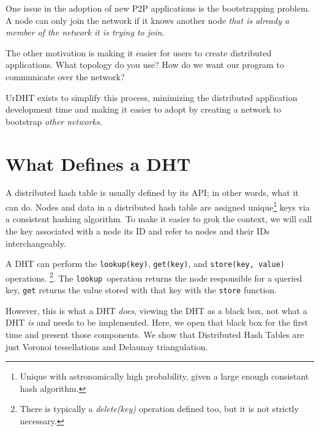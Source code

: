 \documentclass[11pt,conference]{IEEEtran}
\begin{document}
One issue in the adoption of new P2P applications is the bootstrapping problem.
A node can only join the network if it knows another node \textit{that is already a member of the network it is trying to join.}


The other motivation is making it easier for users to create distributed applications.
What topology do you use?
How do we want our program to communicate over the network?


UrDHT exists to simplify this process, minimizing the distributed application development time and making it easier to adopt by creating a network to bootstrap \textit{other networks}.

\section{What Defines a DHT}
\label{sec:define}

A distributed hash table is usually defined by its API; in other words, what it can do.
Nodes and data in a distributed hash table are assigned unique\footnote{Unique with astronomically high probability, given a large enough consistant hash algorithm.} keys via a consistent hashing algorithm.
To make it easier to grok the context, we will call the key associated with a node its ID and refer to  nodes and their IDs interchangeably.

A DHT can perform the \texttt{lookup(key)}, \texttt{get(key)}, and \texttt{store(key, value)} operations. \footnote{There is typically a \textit{delete(key)} operation defined too, but it is not strictly necessary.}.
The \texttt{lookup }operation returns the node responsible for a queried key, \texttt{get} returns the value stored with that key with the \texttt{store} function.

However, this is what a DHT \textit{does}, viewing the DHT as a black box, not what a DHT \textit{is} and needs to be implemented.
Here, we open that black box for the first time and present those components.
We show that Distributed Hash Tables are just Voronoi tessellations and Delaunay triangulation.
\end{document}
